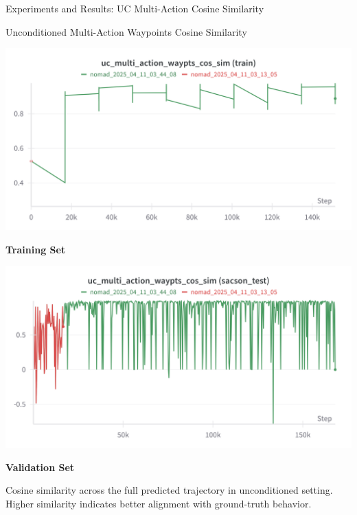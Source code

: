 \documentclass{beamer}
\begin{document}
\begin{frame}{Experiments and Results: UC Multi-Action Cosine Similarity}
    \begin{block}{Unconditioned Multi-Action Waypoints Cosine Similarity}
        \begin{minipage}{0.48\textwidth}
            \centering
            \includegraphics[width=\textwidth]{images/cs_multi_action_cos_train.png}
            
            \textbf{Training Set}
        \end{minipage}
        \hfill
        \begin{minipage}{0.48\textwidth}
            \centering
            \includegraphics[width=\textwidth]{images/uc_multi_action_sim_test.png}
            
            \textbf{Validation Set}
        \end{minipage}
        
        \vspace{0.5em}
        \bigskip
        Cosine similarity across the full predicted trajectory in unconditioned setting. Higher similarity indicates better alignment with ground-truth behavior.
    \end{block}
\end{frame}
\end{document}
